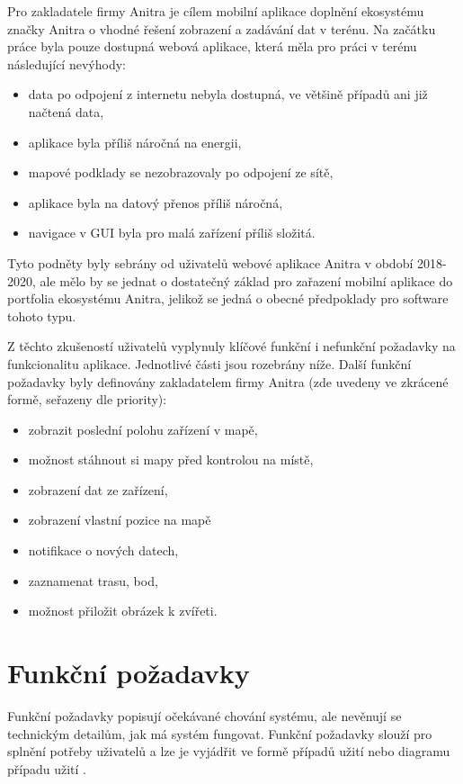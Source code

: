 Pro zakladatele firmy Anitra je cílem mobilní aplikace doplnění ekosystému značky Anitra o vhodné řešení zobrazení a zadávání dat v terénu. Na začátku práce byla pouze dostupná webová aplikace, která měla pro práci v terénu následující nevýhody:

\begin{itemize}
	\item data po odpojení z internetu nebyla dostupná, ve většině případů ani již načtená data,
	\item aplikace byla příliš náročná na energii,
	\item mapové podklady se nezobrazovaly po odpojení ze sítě,
	\item aplikace byla na datový přenos příliš náročná,
	\item navigace v GUI byla pro malá zařízení příliš složitá.
\end{itemize}

Tyto podněty byly sebrány od uživatelů webové aplikace Anitra v období 2018-2020, ale mělo by se jednat o dostatečný základ pro zařazení mobilní aplikace do portfolia ekosystému Anitra, jelikož se jedná o obecné předpoklady pro software tohoto typu.

Z těchto zkušeností uživatelů vyplynuly klíčové funkční i nefunkční požadavky na funkcionalitu aplikace. Jednotlivé části jsou rozebrány níže. Další funkční požadavky byly definovány zakladatelem firmy Anitra (zde uvedeny ve zkrácené formě, seřazeny dle priority):

\begin{itemize}
	\item zobrazit poslední polohu zařízení v mapě,
	\item možnost stáhnout si mapy před kontrolou na místě,
	\item zobrazení dat ze zařízení,
	\item zobrazení vlastní pozice na mapě
	\item notifikace o nových datech,
	\item zaznamenat trasu, bod,
	\item možnost přiložit obrázek k zvířeti.
\end{itemize}

\section{Funkční požadavky}

Funkční požadavky popisují očekávané chování systému, ale nevěnují se technickým detailům, jak má systém fungovat. Funkční požadavky slouží pro splnění potřeby uživatelů a lze je vyjádřit ve formě případů užití nebo diagramu případu užití \cite{jacobson1987object}.

